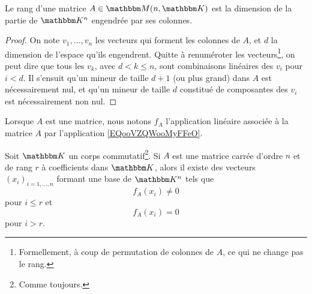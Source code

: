 \begin{proposition}       \label{DEFooCSGXooFRzLRj}
    Le rang d'une matrice \(A \in \eM(n,\eK)\) est la dimension de la partie de \( \eK^n\) engendrée par ses colonnes.
\end{proposition}
\begin{proof}
  On note \( v_1,\dots, v_n\) les vecteurs qui forment les colonnes de \( A \), et \( d \) la dimension de l'espace qu'ils engendrent. Quitte à renuméroter les vecteurs\footnote{Formellement, à coup de permutation de colonnes de \(A \), ce qui ne change pas le rang.}, on peut dire que tous les \( v_k \), avec \( d < k \leq n \), sont combinaisons linéaires des \( v_i \) pour \( i < d\). Il s'ensuit qu'un mineur de taille \( d+1 \) (ou plus grand) dans \( A \) est nécessairement nul, et qu'un mineur de taille \( d \) constitué de composantes des \( v_i \) est nécessairement non nul.
\end{proof}


Lorsque \( A\) est une matrice, nous notons \( f_A\) l'application linéaire associée à la matrice \( A\) par l'application \eqref{EQooVZQWooMyFFeO}.

\begin{lemma} \label{LEMVecsaRgFixe}
    Soit \( \eK \) un corps commutatif\footnote{Comme toujours.}. Si \( A \) est une matrice carrée d'ordre \( n \) et de rang \( r \) à coefficients dans \( \eK \), alors il existe des vecteurs \( (x_i)_{i=1,\dots,n} \) formant une base de \( \eK^n \) tels que 
    \begin{equation}
        f_A(x_i)\neq 0
    \end{equation}
    pour \( i\leq r\) et
    \begin{equation}
        f_A(x_i) = 0
    \end{equation}
    pour \( i > r \).
\end{lemma}


